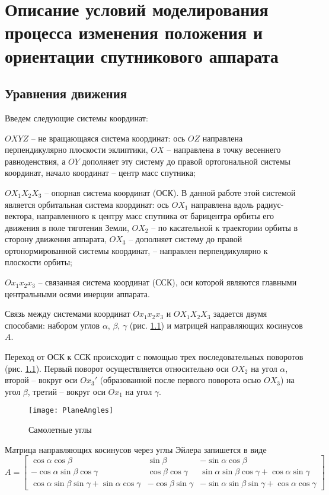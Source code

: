 \chapter{Описание условий моделирования процесса изменения положения и ориентации
спутникового аппарата}
\section{Уравнения движения}
\noindent\indent Введем следующие системы координат:\par
\noindent $OXYZ$ -- не вращающаяся система координат: ось $OZ$ направлена
перпендикулярно плоскости эклиптики, $OX$ -- направлена в точку весеннего
равноденствия, а $OY$ дополняет эту систему до правой ортогональной системы
координат, начало координат -- центр масс спутника;\par
\noindent $OX_1X_2X_3$ -- опорная система координат (ОСК). В данной работе
этой системой является орбитальная система координат: ось $OX_1$ направлена вдоль
радиус-вектора, направленного к центру масс спутника от барицентра орбиты его движения
 в поле тяготения Земли, $OX_2$ -- по касательной к траектории орбиты в сторону
движения аппарата, $OX_3$ -- дополняет систему до правой ортонормированной системы
координат, -- направлен перпендикулярно к плоскости орбиты;\par
\noindent $Ox_1x_2x_3$ -- связанная система координат (ССК), оси которой являются
главными центральными осями инерции аппарата.\par
    Связь между системами координат $Ox_1x_2x_3$ и $OX_1X_2X_3$ задается двумя
способами: набором углов $\alpha$, $\beta$, $\gamma$ (рис. \ref{fig:KrilovAngles})
и матрицей направляющих косинусов $A$.\par
    Переход от ОСК к ССК происходит с помощью трех последовательных поворотов
(рис. \ref{fig:KrilovAngles}). Первый поворот осуществляется относительно оси $OX_2$
на угол $\alpha$, второй -- вокруг оси $Ox_3'$ (образованной после первого поворота
осью $OX_3$) на угол $\beta$, третий -- вокруг оси $Ox_1$ на угол $\gamma$.
\begin{figure}[h]
  \centering
  \texttt{[image: PlaneAngles]}
  \caption{Самолетные углы}
  \label{fig:KrilovAngles}
\end{figure}\par
    Матрица направляющих косинусов через углы Эйлера запишется в виде
\begin{equation}
    A = \begin{bmatrix}
        \cos\alpha\cos\beta & \sin\beta & -\sin\alpha\cos\beta\\
        -\cos\alpha\sin\beta\cos\gamma & \cos\beta\cos\gamma & \sin\alpha\sin\beta\cos\gamma + \cos\alpha\sin\gamma \\
        \cos\alpha\sin\beta\sin\gamma + \sin\alpha\cos\gamma & -\cos\beta\sin\gamma & -\sin\alpha\sin\beta\sin\gamma + \cos\alpha\cos\gamma
    \end{bmatrix}
\end{equation}
